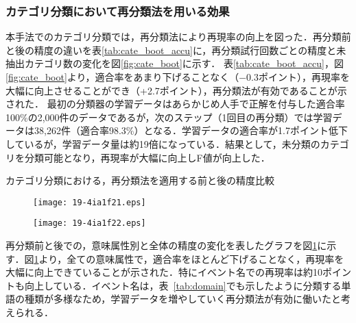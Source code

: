 \documentclass[japanese]{jnlp_1.4}
\begin{document}
\subsubsection{カテゴリ分類において再分類法を用いる効果}

本手法でのカテゴリ分類では，再分類法により再現率の向上を図った．再分類前と後の精度の違いを表\ref{tab:cate_boot_accu}に，再分類試行回数ごとの精度と未抽出カテゴリ数の変化を図\ref{fig:cate_boot}に示す．
表\ref{tab:cate_boot_accu}，図\ref{fig:cate_boot}より，適合率をあまり下げることなく（$-0.3$ポイント），再現率を大幅に向上させることができ（+2.7ポイント），再分類法が有効であることが示された．
最初の分類器の学習データはあらかじめ人手で正解を付与した適合率100\%の2,000件のデータであるが，次のステップ（1回目の再分類）では学習データは38,262件（適合率98.3\%）となる．学習データの適合率が1.7ポイント低下しているが，学習データ量は約19倍になっている．結果として，未分類のカテゴリを分類可能となり，再現率が大幅に向上しF値が向上した．

\begin{table}[t]
\caption{カテゴリ分類における，再分類法を適用する前と後の精度比較}
\label{tab:cate_boot_accu}

\end{table}
\begin{figure}[t]
\setlength{\captionwidth}{191pt}
\begin{minipage}[t]{191pt}
\begin{center}
\texttt{[image: 19-4ia1f21.eps]}
\end{center}
\label{fig:cate_boot}
\end{minipage}
\hfill
\begin{minipage}[t]{191pt}
\begin{center}
\texttt{[image: 19-4ia1f22.eps]}
\end{center}
\label{fig:cate_boot_pre}
\end{minipage}
\end{figure}

再分類前と後での，意味属性別と全体の精度の変化を表したグラフを図\ref{fig:cate_boot_pre}に示す．図\ref{fig:cate_boot_pre}より，全ての意味属性で，適合率をほとんど下げることなく，再現率を大幅に向上できていることが示された．特にイベント名での再現率は約10ポイントも向上している．イベント名は，表~\ref{tab:domain}でも示したように分類する単語の種類が多様なため，学習データを増やしていく再分類法が有効に働いたと考えられる．
\end{document}
